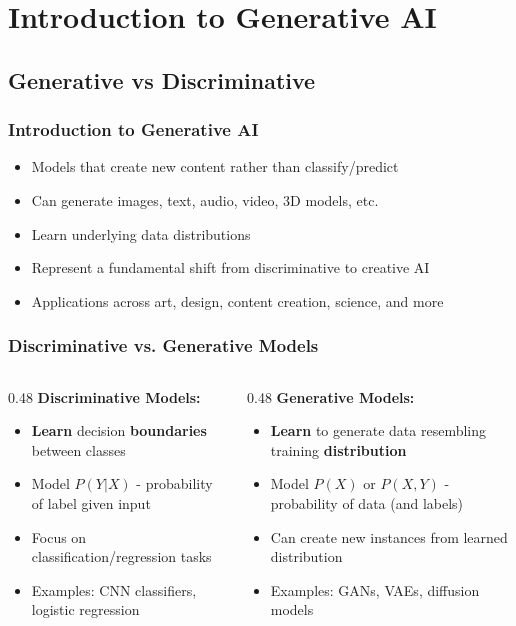 \documentclass[5pt,aspectratio=169]{beamer}
\begin{document}
\section{Introduction to Generative AI}
\subsection{Generative vs Discriminative}
\begin{frame}
\frametitle{Introduction to Generative AI}
\begin{itemize}
    \item Models that create new content rather than classify/predict
    \item Can generate images, text, audio, video, 3D models, etc.
    \item Learn underlying data distributions
    \item Represent a fundamental shift from discriminative to creative AI
    \item Applications across art, design, content creation, science, and more
\end{itemize}
\end{frame}

\begin{frame}
\frametitle{Discriminative vs. Generative Models}
\begin{columns}
\begin{column}{0.48\textwidth}
\textbf{Discriminative Models:}
\begin{itemize}
    \item \textbf{Learn} decision \textbf{boundaries} between classes
    \item<2-> Model $P(Y|X)$ - probability of label given input
    \item<3-> Focus on classification/regression tasks
    \item<4-> Examples: CNN classifiers, logistic regression
\end{itemize}
\end{column}
\begin{column}{0.48\textwidth}
\textbf{Generative Models:}
\begin{itemize}
    \item \textbf{Learn} to generate data resembling training \textbf{distribution}
    \item<2-> Model $P(X)$ or $P(X,Y)$ - probability of data (and labels)
    \item<3-> Can create new instances from learned distribution
    \item<4-> Examples: GANs, VAEs, diffusion models
\end{itemize}
\end{column}
\end{columns}

\end{frame}
\end{document}
